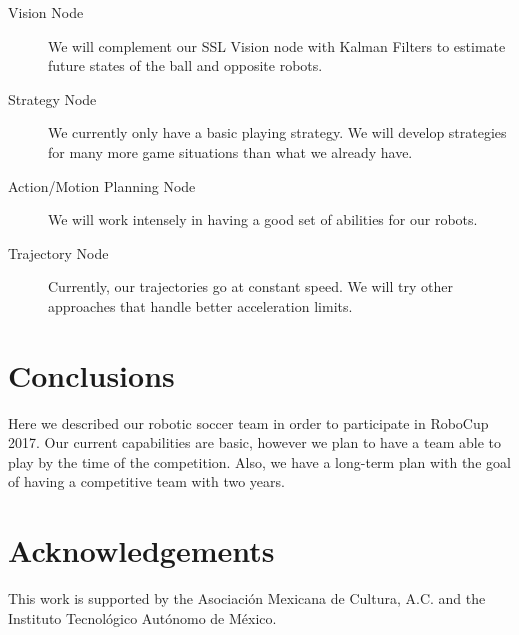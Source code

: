 \documentclass[]{llncs}
\newcommand{\TODO}[1]{{\textcolor{blue}{ToDo: {#1}}}}
\begin{document}
\begin{description}
	\item[Vision Node] We will complement our SSL Vision node with Kalman Filters to estimate future states of the ball and opposite robots.
	\item[Strategy Node] We currently only have a basic playing strategy. We will develop strategies for many more game situations than what we already have.
	\item[Action/Motion Planning Node] We will work intensely in having a good set of abilities for our robots.
	\item[Trajectory Node] Currently, our trajectories go at constant speed. We will try other approaches that handle better acceleration limits.
\end{description}


\section{Conclusions}

Here we described our robotic soccer team in order to participate in RoboCup 2017. Our current capabilities are basic, however we plan to have a team able to play by the time of the competition. Also, we have a long-term plan with the goal of having a competitive team with two years. 



\section{Acknowledgements}
This work is supported by the Asociación Mexicana de Cultura, A.C. and the Instituto Tecnológico Autónomo de México.



\end{document}
